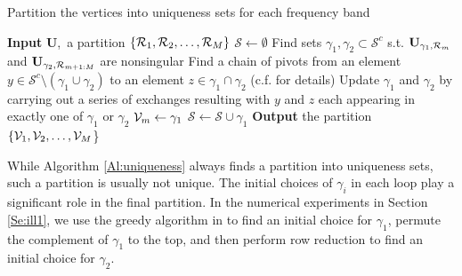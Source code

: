 \documentclass[journal, 10pt]{IEEEtran}
\begin{document}
\begin{algorithm}[tb] 
\caption{Partition the vertices into uniqueness sets for each frequency band}
\begin{algorithmic}
\State \textbf{Input} $\mathbf{U}$,~a partition $\{{{\cal R}_1,{\cal R}_2,\ldots,{\cal R}_M}\}$ %
\State $\mathcal{S} \gets \emptyset$
\State Find sets $\gamma_1, \gamma_2 \subset {\mathcal{S}}^c$ s.t. $\mathbf{U}_{\gamma_1,{\cal R}_m}$ and $\mathbf{U}_{\gamma_2,{\cal R}_{m+1:M}}$ are nonsingular
\While {$\gamma_1 \cap \gamma_2 \neq \emptyset$}
\State Find a chain of pivots from an element $y \in {\mathcal S}^c \setminus (\gamma_1 \cup \gamma_2)$
to an element $z \in \gamma_1 \cap \gamma_2$ (c.f. \cite{greene_magnanti} for details)
\State Update $\gamma_1$ and $\gamma_2$ by carrying out a series of exchanges resulting with $y$ and $z$ each appearing in exactly one of $\gamma_1$ or $\gamma_2$
\EndWhile
\State ${\mathcal{V}}_m \gets \gamma_1$%
\State $\mathcal{S} \gets \mathcal{S} \cup \gamma_1$ %
\EndFor
\State \textbf{Output} the partition $\{{\mathcal{V}}_1,{\mathcal{V}}_2,\ldots,{\mathcal{V}}_M$\}
\end{algorithmic}
\label{Al:uniqueness}
\end{algorithm}

\begin{remark}
While Algorithm \ref{Al:uniqueness} always finds a partition into uniqueness sets, such a partition is usually not unique. The initial choices of $\gamma_i$ in each loop play a significant role in the final 
partition. In the numerical experiments in Section \ref{Se:ill1}, we use the greedy algorithm in \cite[Algorithm 1]{shomorony}  to find an initial choice for $\gamma_1$, %
permute the complement of $\gamma_1$ to the top,
and then perform row reduction 
to find an initial choice for $\gamma_2$.  %
\end{remark}
\end{document}
